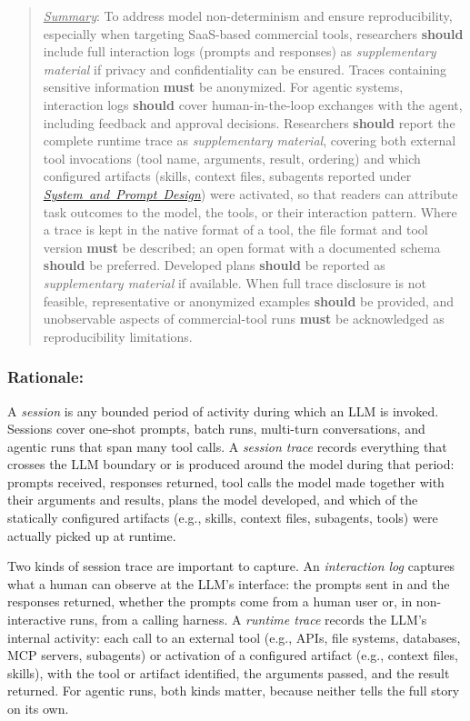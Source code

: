 \documentclass[smallextended]{svjour3}
\newcommand{\must}{\textbf{must}\xspace}
\newcommand{\should}{\textbf{should}\xspace}
\newcommand{\summary}{\underline{\emph{Summary}}\xspace}
\newcommand{\summary}{\textbf{\emph{Summary}}\xspace}
\newcommand{\supplementarymaterial}{\emph{supplementary material}\xspace}
\newcommand{\supplementarymaterial}{\emph{supplementary material}\xspace}
\newenvironment{framed}{\begin{quote}}{\end{quote}}
\newcommand{\design}{\hyperref[sec:report-system-and-prompt-design]{\mbox{\emph{System and Prompt Design}}}\xspace}
\newcommand{\design}{\href{/guidelines/design/}{\emph{System and Prompt Design}}\xspace}
\newcommand{\guidelinesubsubsection}[1]{\subsubsection{\bfseries #1:}}
\newcommand{\guidelinesubsubsection}[1]{\subsubsection{#1}}
\begin{document}
\vspace{0.5\baselineskip}
\begin{framed}
\summary: %
To address model non-determinism and ensure reproducibility, especially when targeting SaaS-based commercial tools, researchers \should include full interaction logs (prompts and responses) as \supplementarymaterial if privacy and confidentiality can be ensured. Traces containing sensitive information \must be anonymized. For agentic systems, interaction logs \should cover human-in-the-loop exchanges with the agent, including feedback and approval decisions. Researchers \should report the complete runtime trace as \supplementarymaterial, covering both external tool invocations (tool name, arguments, result, ordering) and which configured artifacts (skills, context files, subagents reported under \design) were activated, so that readers can attribute task outcomes to the model, the tools, or their interaction pattern. Where a trace is kept in the native format of a tool, the file format and tool version \must be described; an open format with a documented schema \should be preferred. Developed plans \should be reported as \supplementarymaterial if available. When full trace disclosure is not feasible, representative or anonymized examples \should be provided, and unobservable aspects of commercial-tool runs \must be acknowledged as reproducibility limitations.
\end{framed}

\guidelinesubsubsection{Rationale}

A \emph{session} is any bounded period of activity during which an LLM is invoked. Sessions cover one-shot prompts, batch runs, multi-turn conversations, and agentic runs that span many tool calls.
A \emph{session trace} records everything that crosses the LLM boundary or is produced around the model during that period: prompts received, responses returned, tool calls the model made together with their arguments and results, plans the model developed, and which of the statically configured artifacts (e.g., skills, context files, subagents, tools) were actually picked up at runtime.

Two kinds of session trace are important to capture.
An \emph{interaction log} captures what a human can observe at the LLM's interface: the prompts sent in and the responses returned, whether the prompts come from a human user or, in non-interactive runs, from a calling harness.
A \emph{runtime trace} records the LLM's internal activity: each call to an external tool (e.g., APIs, file systems, databases, MCP servers, subagents) or activation of a configured artifact (e.g., context files, skills), with the tool or artifact identified, the arguments passed, and the result returned. For agentic runs, both kinds matter, because neither tells the full story on its own.
\end{document}
